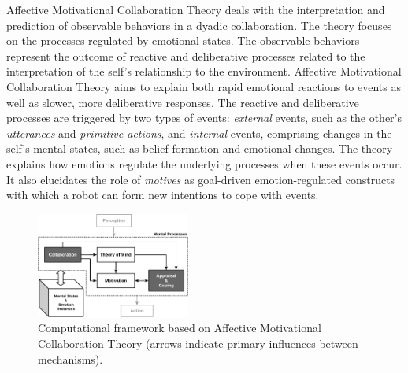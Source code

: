 \documentclass{aamas2016}
\begin{document}
Affective Motivational Collaboration Theory deals with the interpretation and
prediction of observable behaviors in a dyadic collaboration. The theory focuses
on the processes regulated by emotional states. The observable behaviors
represent the outcome of reactive and deliberative processes related to the
interpretation of the self's relationship to the environment. Affective
Motivational Collaboration Theory aims to explain both rapid emotional reactions
to events as well as slower, more deliberative responses. The reactive and
deliberative processes are triggered by two types of events: \textit{external}
events, such as the other's \textit{utterances} and \textit{primitive actions},
and \textit{internal} events, comprising changes in the self's mental states,
such as belief formation and emotional changes. The theory explains how emotions
regulate the underlying processes when these events occur. It also elucidates
the role of \textit{motives} as goal-driven emotion-regulated constructs with
which a robot can form new intentions to cope with events.

\begin{figure}[tbh]
  \centering
  \includegraphics[width=0.45\textwidth]{figure/theory-general-croped.pdf}
  \caption{{\fontsize{9}{9}\selectfont Computational framework based on
  Affective Motivational Collaboration Theory (arrows indicate primary
  influences between mechanisms).}}
  \label{fig:cpm}
\end{figure}
\end{document}
